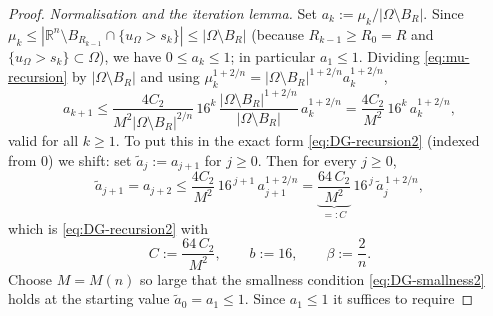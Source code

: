 \documentclass[11pt]{amsart}
\theoremstyle{definition}
\newcommand{\R}{\mathbb R}
\newcommand{\Om}{\Omega}
\newcommand{\abs}[1]{\left|#1\right|}
\begin{document}
\begin{proof}
\smallskip
\emph{Normalisation and the iteration lemma.} Set
$a_k:=\mu_k/\abs{\Om\setminus B_R}$. Since
$\mu_k\le\abs{\R^n\setminus B_{R_{k-1}}\cap\{u_\Om>s_k\}}
\le\abs{\Om\setminus B_R}$ (because $R_{k-1}\ge R_0=R$ and
$\{u_\Om>s_k\}\subset\Om$), we have $0\le a_k\le1$; in particular
$a_1\le1$.
Dividing \eqref{eq:mu-recursion} by
$\abs{\Om\setminus B_R}$ and using
$\mu_k^{1+2/n}=\abs{\Om\setminus B_R}^{1+2/n}a_k^{1+2/n}$,
\[
   a_{k+1}
   \le\frac{4C_2}{M^2\abs{\Om\setminus B_R}^{2/n}}\,16^k\,
   \frac{\abs{\Om\setminus B_R}^{1+2/n}}{\abs{\Om\setminus B_R}}
   \,a_k^{1+2/n}
   =\frac{4C_2}{M^2}\,16^{k}\,a_k^{1+2/n},
\]
valid for all $k\ge1$.
To put this in the exact form
\eqref{eq:DG-recursion2} (indexed from $0$) we shift: set
$\widetilde a_j:=a_{j+1}$ for $j\ge0$. Then for every $j\ge0$,
\[
   \widetilde a_{j+1}=a_{j+2}
   \le\frac{4C_2}{M^2}\,16^{\,j+1}\,a_{j+1}^{1+2/n}
   =\underbrace{\frac{64\,C_2}{M^2}}_{=:C}\,16^{\,j}\,
     \widetilde a_j^{\,1+2/n},
\]
which is \eqref{eq:DG-recursion2} with
\[
   C:=\frac{64\,C_2}{M^2},\qquad b:=16,\qquad\beta:=\frac2n .
\]
Choose $M=M(n)$ so large that the smallness condition
\eqref{eq:DG-smallness2} holds at the starting value
$\widetilde a_0=a_1\le1$. Since $a_1\le1$ it suffices to require

\end{proof}
\end{document}
